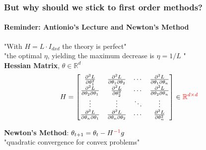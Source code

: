 \documentclass[
	11pt, %
	aspectratio=169, %
]{beamer}
\begin{document}
\begin{frame}
	\frametitle{But why should we stick to first order methods?}
	\framesubtitle{Reminder: Antionio's Lecture and Newton's Method}
		"With $H= L \cdot I_{dxd}$ the theory is perfect" \\
		"the optimal $\eta$, yielding the maximum decrease is $\eta = 1/L$ "\\
		\vspace{1em}
		\textbf{{Hessian Matrix}}, $\theta \in \mathbb{R}^d$
\[
H = \begin{bmatrix}
\frac{\partial^2 L}{\partial \theta_1^2} & \frac{\partial^2 L}{\partial \theta_1 \partial \theta_2} & \cdots & \frac{\partial^2 L}{\partial \theta_1 \partial \theta_n} \\
\frac{\partial^2 L}{\partial \theta_2 \partial \theta_1} & \frac{\partial^2 L}{\partial \theta_2^2} & \cdots & \frac{\partial^2 L}{\partial \theta_2 \partial \theta_n} \\
\vdots & \vdots & \ddots & \vdots \\
\frac{\partial^2 L}{\partial \theta_n \partial \theta_1} & \frac{\partial^2 L}{\partial \theta_n \partial \theta_2} & \cdots & \frac{\partial^2 L}{\partial \theta_n^2}
\end{bmatrix} \in \textcolor{red}{\mathbb{R}^{d\times d}}
\]

		\textbf{Newton's Method}: $\theta_{t+1} = \theta_t - H^{\textcolor{red}{-1}} g$\\
		"quadratic convergence for convex problems"

\end{frame}
\end{document}
